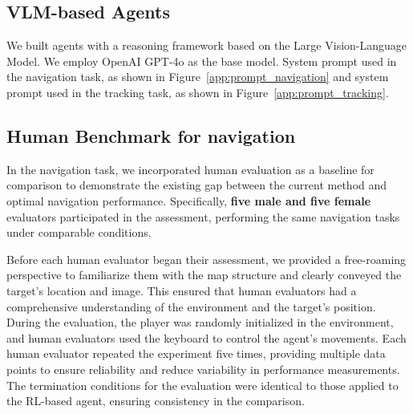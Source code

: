 \subsection{VLM-based Agents}
\label{app:prompt}
We built agents with a reasoning framework based on the Large Vision-Language Model. We employ OpenAI GPT-4o as the base model.
System prompt used in the navigation task, as shown in Figure~\ref{app:prompt_navigation} and system prompt used in the tracking task, as shown in Figure~\ref{app:prompt_tracking}.

\subsection{Human Benchmark for navigation}
In the navigation task, we incorporated human evaluation as a baseline for comparison to demonstrate the existing gap between the current method and optimal navigation performance. Specifically, \textbf{five male and five female} evaluators participated in the assessment, performing the same navigation tasks under comparable conditions. 

Before each human evaluator began their assessment, we provided a free-roaming perspective to familiarize them with the map structure and clearly conveyed the target's location and image. This ensured that human evaluators had a comprehensive understanding of the environment and the target’s position. During the evaluation, the player was randomly initialized in the environment, and human evaluators used the keyboard to control the agent's movements. Each human evaluator repeated the experiment five times, providing multiple data points to ensure reliability and reduce variability in performance measurements. The termination conditions for the evaluation were identical to those applied to the RL-based agent, ensuring consistency in the comparison.


